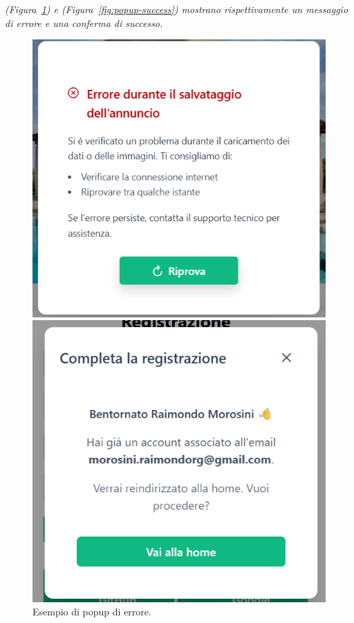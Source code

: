 \vspace{4pt}
\textit{(Figura~\ref{fig:popup-errore}) e (Figura~\ref{fig:popup-success}) mostrano rispettivamente un messaggio di errore e una conferma di successo.}

\begin{figure}[H]
\centering
\begin{minipage}[t]{0.48\textwidth}
    \centering
    \includegraphics[width=\textwidth]{Immagini/Expert Reviews/Sito/CreazioneAnnuncioErrore.png}
    \caption{Esempio di popup di errore.}
    \label{fig:popup-errore}
\end{minipage}
\hfill
\begin{minipage}[t]{0.48\textwidth}
    \centering
    \includegraphics[width=\textwidth]{Immagini/Expert Reviews/Sito/PopupRegistrazioneAccountGoogleGiaPresentepng.png}

\end{minipage}
\end{figure}
